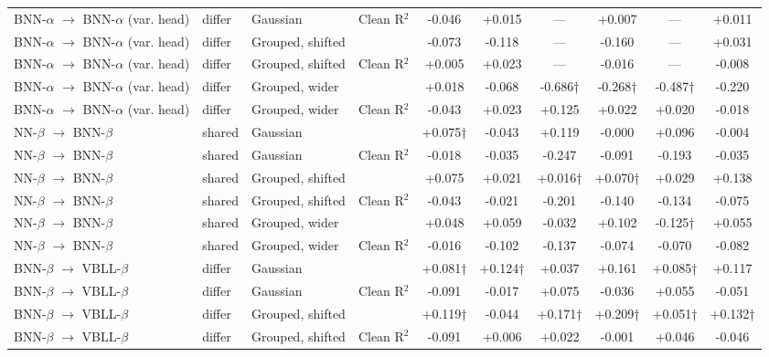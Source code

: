 \begin{landscape}
{\begin{longtable}{llllcccccc}
BNN-$\alpha$ $\rightarrow$ BNN-$\alpha$ (var. head) & differ & Gaussian & Clean R$^2$ & -0.046 & +0.015 & --- & +0.007 & --- & +0.011 \\
BNN-$\alpha$ $\rightarrow$ BNN-$\alpha$ (var. head) & differ & Grouped, shifted & \aucnorm{} & -0.073 & -0.118 & --- & -0.160 & --- & +0.031 \\
BNN-$\alpha$ $\rightarrow$ BNN-$\alpha$ (var. head) & differ & Grouped, shifted & Clean R$^2$ & +0.005 & +0.023 & --- & -0.016 & --- & -0.008 \\
BNN-$\alpha$ $\rightarrow$ BNN-$\alpha$ (var. head) & differ & Grouped, wider & \aucnorm{} & +0.018 & -0.068 & -0.686† & -0.268† & -0.487† & -0.220 \\
BNN-$\alpha$ $\rightarrow$ BNN-$\alpha$ (var. head) & differ & Grouped, wider & Clean R$^2$ & -0.043 & +0.023 & +0.125 & +0.022 & +0.020 & -0.018 \\
NN-$\beta$ $\rightarrow$ BNN-$\beta$ & shared & Gaussian & \aucnorm{} & +0.075† & -0.043 & +0.119 & -0.000 & +0.096 & -0.004 \\
NN-$\beta$ $\rightarrow$ BNN-$\beta$ & shared & Gaussian & Clean R$^2$ & -0.018 & -0.035 & -0.247 & -0.091 & -0.193 & -0.035 \\
NN-$\beta$ $\rightarrow$ BNN-$\beta$ & shared & Grouped, shifted & \aucnorm{} & +0.075 & +0.021 & +0.016† & +0.070† & +0.029 & +0.138 \\
NN-$\beta$ $\rightarrow$ BNN-$\beta$ & shared & Grouped, shifted & Clean R$^2$ & -0.043 & -0.021 & -0.201 & -0.140 & -0.134 & -0.075 \\
NN-$\beta$ $\rightarrow$ BNN-$\beta$ & shared & Grouped, wider & \aucnorm{} & +0.048 & +0.059 & -0.032 & +0.102 & -0.125† & +0.055 \\
NN-$\beta$ $\rightarrow$ BNN-$\beta$ & shared & Grouped, wider & Clean R$^2$ & -0.016 & -0.102 & -0.137 & -0.074 & -0.070 & -0.082 \\
BNN-$\beta$ $\rightarrow$ VBLL-$\beta$ & differ & Gaussian & \aucnorm{} & +0.081† & +0.124† & +0.037 & +0.161 & +0.085† & +0.117 \\
BNN-$\beta$ $\rightarrow$ VBLL-$\beta$ & differ & Gaussian & Clean R$^2$ & -0.091 & -0.017 & +0.075 & -0.036 & +0.055 & -0.051 \\
BNN-$\beta$ $\rightarrow$ VBLL-$\beta$ & differ & Grouped, shifted & \aucnorm{} & +0.119† & -0.044 & +0.171† & +0.209† & +0.051† & +0.132† \\
BNN-$\beta$ $\rightarrow$ VBLL-$\beta$ & differ & Grouped, shifted & Clean R$^2$ & -0.091 & +0.006 & +0.022 & -0.001 & +0.046 & -0.046 \\

\end{longtable}}
\end{landscape}
